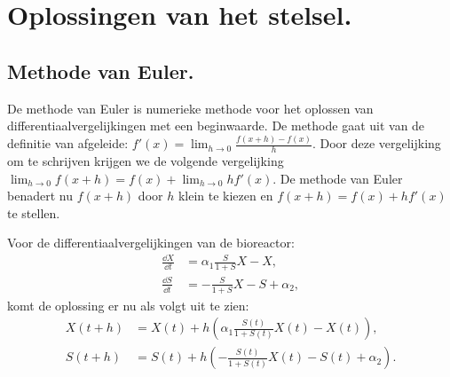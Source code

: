 
\chapter{Oplossingen van het stelsel.}
\label{Oplossingen van het stelsel}

\section{Methode van Euler.}
De methode van Euler is numerieke methode voor het oplossen van differentiaalvergelijkingen met een beginwaarde. De methode gaat uit van de definitie van afgeleide: $f'(x) = \lim_{h\to0}\frac{f(x+h)-f(x)}{h}$. Door deze vergelijking om te schrijven krijgen we de volgende vergelijking $\lim_{h\to0}f(x+h) = f(x) + \lim_{h\to0}hf'(x)$. De methode van Euler benadert nu $f(x+h)$ door $h$ klein te kiezen en $f(x+h) = f(x) + hf'(x)$ te stellen.

Voor de differentiaalvergelijkingen van de bioreactor:
\begin{align*}
	\frac{\dd X}{\dd t} &= \alpha_1 \frac{S}{1 + S} X - X,\\
	\frac{\dd S}{\dd t} &= - \frac{S}{1 + S}X - S + \alpha_2,
\end{align*}
komt de oplossing er nu als volgt uit te zien:
\begin{align*}
	X(t+h) &= X(t) + h \left( \alpha_1 \frac{S(t)}{1 + S(t)} X(t) - X(t) \right),\\
	S(t+h) &= S(t) + h \left(- \frac{S(t)}{1 + S(t)}X(t) - S(t) + \alpha_2 \right).
\end{align*}

